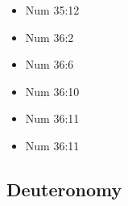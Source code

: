 \documentclass[14pt]{article}
\begin{document}
\begin{multicols}{2}
\begin{itemize}
\item Num 35:12

\item Num 36:2

\item Num 36:6

\item Num 36:10

\item Num 36:11

\item Num 36:11
\end{itemize}\end{multicols}
\subsection{Deuteronomy}
\end{document}
